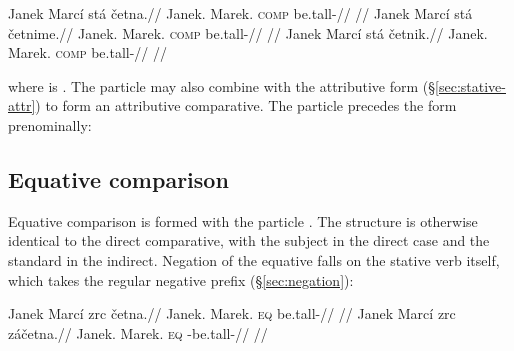 \pex
\a
\begingl
\gla Janek Marcí stá četna.//
\glb Janek.\Dir{} Marek.\Ind{} \textsc{comp} be.tall-\Cont{}//
\glft {}//
\endgl
\a
\begingl
\gla Janek Marcí stá četnime.//
\glb Janek.\Dir{} Marek.\Ind{} \textsc{comp} be.tall-\Prog{}//
\glft {}//
\endgl
\a
\begingl
\gla Janek Marcí stá četnik.//
\glb Janek.\Dir{} Marek.\Ind{} \textsc{comp} be.tall-\Pf{}//
\glft {}//
\endgl
\xe

\noindent where  is . The particle  may also
combine with the  attributive form (§\ref{sec:stative-attr}) to form
an attributive comparative. The particle precedes the  form
prenominally:

\pex
\a {} 
\a {} 
\xe

\subsection{Equative comparison}

Equative comparison is formed with the particle . The structure is
otherwise identical to the direct comparative, with the subject in the direct
case and the standard in the indirect. Negation of the equative falls on the
stative verb itself, which takes the regular negative prefix 
(§\ref{sec:negation}):

\pex
\a
\begingl
\gla Janek Marcí zrc četna.//
\glb Janek.\Dir{} Marek.\Ind{} \textsc{eq} be.tall-\Cont{}//
\glft {}//
\endgl
\a
\begingl
\gla Janek Marcí zrc záčetna.//
\glb Janek.\Dir{} Marek.\Ind{} \textsc{eq} \Neg{}-be.tall-\Cont{}//
\glft {}//
\endgl
\xe
